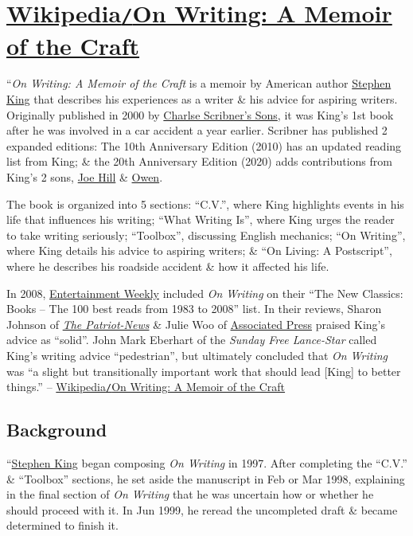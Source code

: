 \documentclass[oneside]{book}
\numberwithin{equation}{section}
\begin{document}

\section{\href{https://en.wikipedia.org/wiki/On_Writing:_A_Memoir_of_the_Craft}{Wikipedia\texttt{/}On Writing: A Memoir of the Craft}}
``\textit{On Writing: A Memoir of the Craft} is a memoir by American author \href{https://en.wikipedia.org/wiki/Stephen_King}{Stephen King} that describes his experiences as a writer \& his advice for aspiring writers. Originally published in 2000 by \href{https://en.wikipedia.org/wiki/Charles_Scribner%27s_Sons}{Charlse Scribner's Sons}, it was King's 1st book after he was involved in a car accident a year earlier. Scribner has published 2 expanded editions: The 10th Anniversary Edition (2010) has an updated reading list from King; \& the 20th Anniversary Edition (2020) adds contributions from King's 2 sons, \href{https://en.wikipedia.org/wiki/Joe_Hill_(writer)}{Joe Hill} \& \href{https://en.wikipedia.org/wiki/Owen_King}{Owen}.

The book is organized into 5 sections: ``C.V.'', where King highlights events in his life that influences his writing; ``What Writing Is'', where King urges the reader to take writing seriously; ``Toolbox'', discussing English mechanics; ``On Writing'', where King details his advice to aspiring writers; \& ``On Living: A Postscript'', where he describes his roadside accident \& how it affected his life.

In 2008, \href{https://en.wikipedia.org/wiki/Entertainment_Weekly}{Entertainment Weekly} included \textit{On Writing} on their ``The New Classics: Books -- The 100 best reads from 1983 to 2008'' list. In their reviews, Sharon Johnson of \href{https://en.wikipedia.org/wiki/The_Patriot-News}{\textit{The Patriot-News}} \& Julie Woo of \href{https://en.wikipedia.org/wiki/Associated_Press}{Associated Press} praised King's advice as ``solid''. John Mark Eberhart of the \textit{Sunday Free Lance-Star} called King's writing advice ``pedestrian'', but ultimately concluded that \textit{On Writing} was ``a slight but transitionally important work that should lead [King] to better things.'' -- \href{https://en.wikipedia.org/wiki/On_Writing:_A_Memoir_of_the_Craft}{Wikipedia\texttt{/}On Writing: A Memoir of the Craft}

\subsection{Background}
``\href{https://en.wikipedia.org/wiki/Stephen_King}{Stephen King} began composing \textit{On Writing} in 1997. After completing the ``C.V.'' \& ``Toolbox'' sections, he set aside the manuscript in Feb or Mar 1998, explaining in the final section of \textit{On Writing} that he was uncertain how or whether he should proceed with it. In Jun 1999, he reread the uncompleted draft \& became determined to finish it.
\end{document}
